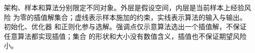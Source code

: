 架构、样本和算法分别限定不同对象。外层是假设空间，内层是当前样本上经验风险
 为零的插值解集合；虚线表示样本施加的约束，实线表示算法的输入与输出。初始化、优化器
 和正则化参与选解。强调点仅示意算法选出一个插值解，不保证任意算法都实现插值；集合
 的形状和大小没有数值含义，插值也不保证期望风险小。
